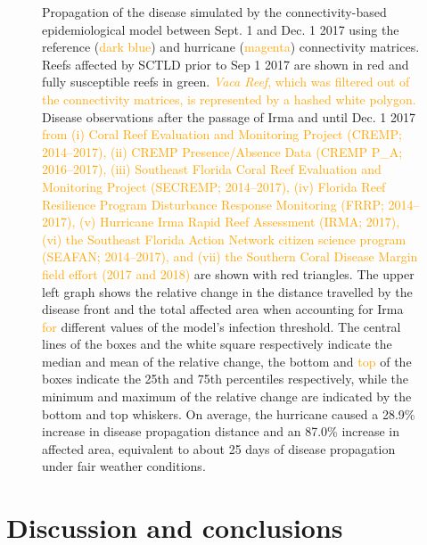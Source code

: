 \documentclass[fleqn,10pt]{wlscirep}
\newcommand{\modif}[1]{\textcolor{orange}{#1}}
\begin{document}
\begin{figure}[tbp]
{        Propagation of the disease simulated by the connectivity-based epidemiological model between Sept. 1 and Dec. 1 2017 using the reference (\modif{dark blue}) and hurricane (\modif{magenta}) connectivity matrices. Reefs affected by SCTLD prior to Sep 1 2017 are shown in red and fully susceptible reefs in green. \modif{\textit{Vaca Reef}, which was filtered out of the connectivity matrices, is represented by a hashed white polygon.} Disease observations after the passage of Irma and until Dec. 1 2017 \modif{from (i) Coral Reef Evaluation and Monitoring Project (CREMP; 2014–2017), (ii) CREMP Presence/Absence Data (CREMP P\_A; 2016–2017), (iii) Southeast Florida Coral Reef Evaluation and Monitoring Project (SECREMP; 2014–2017), (iv) Florida Reef Resilience Program Disturbance Response Monitoring (FRRP; 2014–2017), (v) Hurricane Irma Rapid Reef Assessment (IRMA; 2017), (vi) the Southeast Florida Action Network citizen science program (SEAFAN; 2014–2017), and (vii) the \modif{Southern} Coral Disease Margin field effort (2017 and 2018)} are shown with red triangles. The upper left graph shows the relative change in the distance travelled by the disease front and the total affected area when accounting for Irma \modif{for} different values of the model's infection threshold. The central lines of the boxes and the white square respectively indicate the median and mean of the relative change, the bottom and \modif{top} of the boxes indicate the 25th and 75th percentiles respectively, while the minimum and maximum of the relative change are indicated by the bottom and top whiskers. On average, the hurricane caused  a 28.9\% increase in disease propagation distance and an 87.0\% increase in affected area, equivalent to about 25 days of disease propagation under fair weather conditions.
    }\label{fig:propagation}
\end{figure}

\section{Discussion and conclusions}
\end{document}
